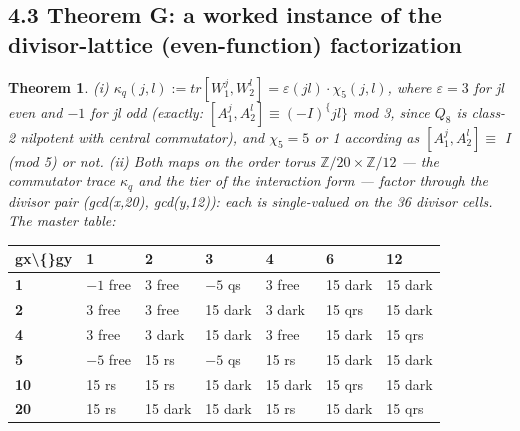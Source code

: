 \documentclass[11pt]{article}
\theoremstyle{plain}
\newtheorem{theorem}{Theorem}[section]
\theoremstyle{definition}
\theoremstyle{remark}
\begin{document}
\subsection{4.3 Theorem G: a worked instance of the divisor-lattice (even-function) factorization}

\begin{theorem}
(i) \(\kappa _{q}(j,l) := tr[W_{1}^{j}, W_{2}^{l}] = \varepsilon (jl) \cdot  \chi _{5}(j,l)\), where \(\varepsilon  = 3\) for jl even and \(-1\) for jl odd (exactly: \([A_{1}^{j}, A_{2}^{l}] \equiv  (-I)^\{jl\}\) mod 3, since \(Q_{8}\) is class-2 nilpotent with central commutator), and \(\chi _{5} = 5\) or 1 according as \([A_{1}^{j}, A_{2}^{l}] \equiv \) I (mod 5) or not. (ii) Both maps on the order torus \(\mathbb{Z}/20 \times  \mathbb{Z}/12\) — the commutator trace \(\kappa _{q}\) and the tier of the interaction form — factor through the divisor pair (gcd(x,20), gcd(y,12)): each is single-valued on the 36 divisor cells. The master table:
\end{theorem}

\begin{center}\small\begin{tabular}{lllllll}\hline

\textbf{gx\textbackslash\{\}gy} & \textbf{1} & \textbf{2} & \textbf{3} & \textbf{4} & \textbf{6} & \textbf{12} \\ \hline

\textbf{1} & \(-1\) free & 3 free & \(-5\) qs & 3 free & 15 dark & 15 dark \\

\textbf{2} & 3 free & 3 free & 15 dark & 3 dark & 15 qrs & 15 dark \\

\textbf{4} & 3 free & 3 dark & 15 dark & 3 free & 15 dark & 15 qrs \\

\textbf{5} & \(-5\) free & 15 rs & \(-5\) qs & 15 rs & 15 dark & 15 dark \\

\textbf{10} & 15 rs & 15 rs & 15 dark & 15 dark & 15 qrs & 15 dark \\

\textbf{20} & 15 rs & 15 dark & 15 dark & 15 rs & 15 dark & 15 qrs \\

\hline\end{tabular}\end{center}
\end{document}
